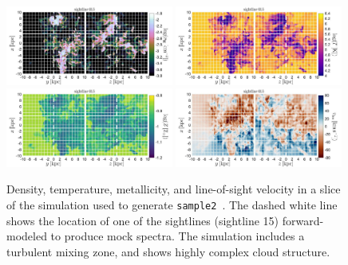 \documentclass[fleqn,usenatbib]{mnras}
\begin{document}
\begin{figure}
    \centering
    \includegraphics[width=0.49\textwidth]{figures/sample2/projections/density_projection_maps_SL_15.jpg}
    \includegraphics[width=0.49\textwidth]{figures/sample2/projections/temperature_projection_maps_SL_15.jpg} \\
    \includegraphics[width=0.49\textwidth]{figures/sample2/projections/metallicity_projection_maps_SL_15.jpg}
    \includegraphics[width=0.49\textwidth]{figures/sample2/projections/velocity_projection_maps_SL_15.jpg}
    \caption{
    Density, temperature, metallicity, and line-of-sight velocity in a slice of the simulation used to generate \texttt{sample2}~\citep{mandelker2020Instability}.
    The dashed white line shows the location of one of the sightlines (sightline 15) forward-modeled to produce mock spectra.
    The simulation includes a turbulent mixing zone, and shows highly complex cloud structure.
    }
    \label{f: sample2 ray 15}
\end{figure}
\end{document}
